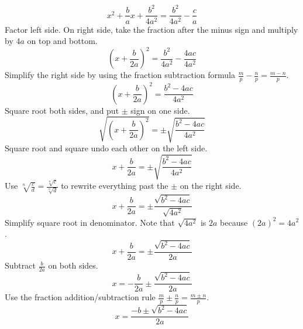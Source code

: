 \documentclass[twoside]{tufte-handout}
\theoremstyle{ekimcustom}
\begin{document}
\begin{center}
\[x^2+\frac{b}{a}x+\frac{b^2}{4a^2}=\frac{b^2}{4a^2}-\frac{c}{a}\]
Factor left side. On right side, take the fraction after the minus sign and multiply by $4a$ on top and bottom.
\[\left(x+\frac{b}{2a}\right)^2=\frac{b^2}{4a^2}-\frac{4ac}{4a^2}\]
Simplify the right side by using the fraction subtraction formula $\frac{m}{p}-\frac{n}{p}=\frac{m-n}{p}$.
\[\left(x+\frac{b}{2a}\right)^2=\frac{b^2-4ac}{4a^2}\]
Square root both sides, and put $\pm$ sign on one side.%
\[\sqrt{\left(x+\frac{b}{2a}\right)^2}=\pm \sqrt{\frac{b^2-4ac}{4a^2}}\]
Square root and square undo each other on the left side.
\[x+\frac{b}{2a}=\pm\sqrt{\frac{b^2-4ac}{4a^2}}\]
Use $\sqrt[n]{\frac{c}{d}}=\frac{\sqrt[n]{c}}{\sqrt[n]{d}}$ to rewrite everything past the $\pm$ on the right side.
\[x+\frac{b}{2a}=\pm\frac{\sqrt{b^2-4ac}}{\sqrt{4a^2}}\]
Simplify square root in denominator. Note that $\sqrt{4a^2}$ is $2a$ because $(2a)^2=4a^2$.
\[x+\frac{b}{2a}=\pm\frac{\sqrt{b^2-4ac}}{2a}\]
Subtract $\frac{b}{2a}$ on both sides.
\[x=-\frac{b}{2a}\pm\frac{\sqrt{b^2-4ac}}{2a}\]
Use the fraction addition/subtraction rule $\frac{m}{p} \pm \frac{n}{p}=\frac{m \pm n}{p}$.
\[x=\frac{-b \pm \sqrt{b^2-4ac}}{2a}\]
\end{center}
\end{document}
